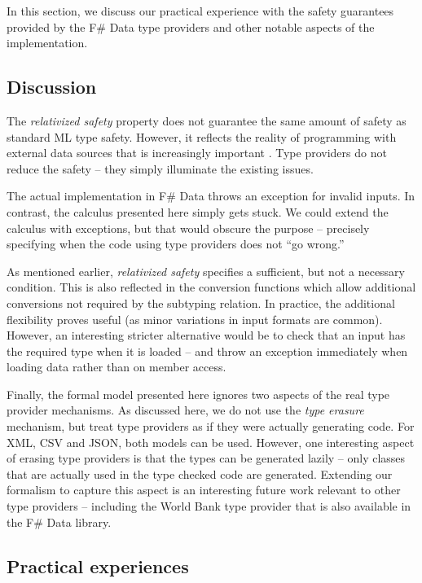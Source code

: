 \documentclass[10pt,preprint,blind,clearpagebib]{sigplanconf}
\begin{document}
In this section, we discuss our practical experience with the safety guarantees provided by the
F\# Data type providers and other notable aspects of the implementation.


\subsection{Discussion}
\label{sec:safety-discuss}

The \emph{relativized safety} property does not guarantee the same amount of safety as standard 
ML type safety. However, it reflects the reality of programming with external data sources that is 
increasingly important \cite{age-of-web}. Type providers do not reduce the safety -- they simply 
illuminate the existing issues.

The actual implementation in F\# Data throws an exception for invalid inputs. In contrast, the calculus
presented here simply gets stuck. We could extend the calculus with exceptions, but that would obscure the 
purpose -- precisely specifying when the code using type providers does not ``go wrong.''

As mentioned earlier, \emph{relativized safety} specifies a sufficient, but not a necessary condition.
This is also reflected in the conversion functions which allow additional conversions not required by 
the subtyping relation. In practice, the additional flexibility proves useful (as minor variations in 
input formats are common). However, an interesting stricter alternative would be to check that an input 
has the required type when it is loaded -- and throw an exception immediately when loading data rather than 
on member access.

Finally, the formal model presented here ignores two aspects of the real type provider mechanisms. As discussed
here, we do not use the \emph{type erasure} mechanism, but treat type providers as if they were actually 
generating code. For XML, CSV and JSON, both models can be used. However, one interesting aspect of erasing 
type providers is that the types can be generated lazily -- only classes that are actually used in the type
checked code are generated. Extending our formalism to capture this aspect is an interesting future work
relevant to other type providers -- including the World Bank type provider that is also available
in the F\# Data library.

\subsection{Practical experiences}
\end{document}
